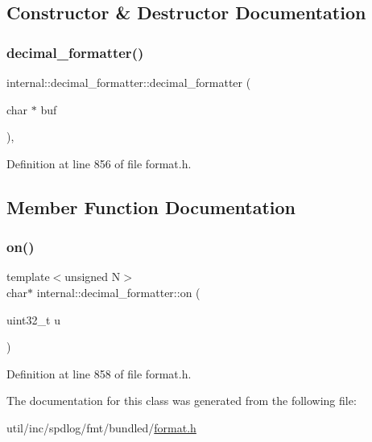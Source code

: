 \subsection{Constructor \& Destructor Documentation}
\mbox{\label{classinternal_1_1decimal__formatter_abcc6a834db70cc360ccb71c4c4c0e3c3}} 
\subsubsection{\texorpdfstring{decimal\+\_\+formatter()}{decimal\_formatter()}}
{\footnotesize\ttfamily internal\+::decimal\+\_\+formatter\+::decimal\+\_\+formatter (\begin{DoxyParamCaption}\item[{char $\ast$}]{buf }\end{DoxyParamCaption})\hspace{0.3cm}{\ttfamily [inline]}, {\ttfamily [explicit]}}



Definition at line 856 of file format.\+h.



\subsection{Member Function Documentation}
\mbox{\label{classinternal_1_1decimal__formatter_af97e1e296d5f7e562ee4c93cb8ea57a6}} 
\subsubsection{\texorpdfstring{on()}{on()}}
{\footnotesize\ttfamily template$<$unsigned N$>$ \\
char$\ast$ internal\+::decimal\+\_\+formatter\+::on (\begin{DoxyParamCaption}\item[{uint32\+\_\+t}]{u }\end{DoxyParamCaption})\hspace{0.3cm}{\ttfamily [inline]}}



Definition at line 858 of file format.\+h.



The documentation for this class was generated from the following file\+:\begin{DoxyCompactItemize}
\item 
util/inc/spdlog/fmt/bundled/\hyperlink{format_8h}{format.\+h}\end{DoxyCompactItemize}
